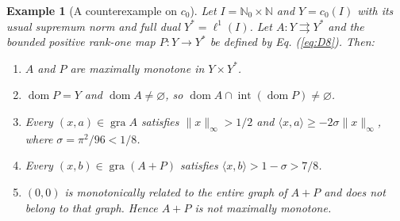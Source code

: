 \documentclass[11pt]{article}
\newcommand{\N}{\mathbb N}
\newcommand{\Nzero}{\mathbb N_0}
\newcommand{\gra}{\operatorname{gra}}
\newcommand{\dom}{\operatorname{dom}}
\newcommand{\pair}[2]{\langle #1,#2\rangle}
\newtheorem{example}{Example}
\theoremstyle{definition}
\theoremstyle{remark}
\begin{document}
\label{sec:c0}
\label{sec:statements}
\begin{example}[A counterexample on $c_0$]\label{thm:C}
Let $I=\Nzero\times\N$ and $Y=c_0(I)$ with its usual supremum norm and full dual $Y^*=\ell^1(I)$. Let $A:Y\rightrightarrows Y^*$ and the bounded positive rank-one map $P:Y\to Y^*$ be defined by Eq. (\ref{eq:D8}). Then:
\begin{enumerate}
\item $A$ and $P$ are maximally monotone in $Y\times Y^*$.
\item $\dom P=Y$ and $\dom A\ne\varnothing$, so
$\dom A\cap\operatorname{int}(\dom P)\ne\varnothing$.
\item Every $(x,a)\in\gra A$ satisfies $\|x\|_\infty>1/2$ and
$\pair{x}{a}\ge-2\sigma\|x\|_\infty$, where $\sigma=\pi^2/96<1/8$.
\item Every $(x,b)\in\gra(A+P)$ satisfies
$\pair{x}{b}>1-\sigma>7/8$.
\item $(0,0)$ is monotonically related to the entire graph of $A+P$ and
does not belong to that graph. Hence $A+P$ is not maximally monotone.
\end{enumerate}
\end{example}
\end{document}
